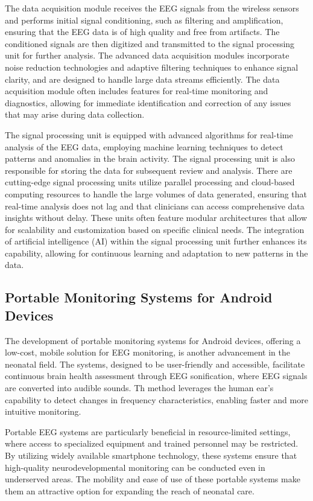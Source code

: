 \documentclass[12pt,journal,compsoc]{IEEEtran}
\begin{document}
The data acquisition module receives the EEG signals from the wireless sensors and performs initial signal conditioning, such as filtering and amplification, ensuring that the EEG data is of high quality and free from artifacts. The conditioned signals are then digitized and transmitted to the signal processing unit for further analysis. The advanced data acquisition modules incorporate noise reduction technologies and adaptive filtering techniques to enhance signal clarity, and are designed to handle large data streams efficiently. The data acquisition module often includes features for real-time monitoring and diagnostics, allowing for immediate identification and correction of any issues that may arise during data collection.

The signal processing unit is equipped with advanced algorithms for real-time analysis of the EEG data, employing machine learning techniques to detect patterns and anomalies in the brain activity. The signal processing unit is also responsible for storing the data for subsequent review and analysis. There are cutting-edge signal processing units utilize parallel processing and cloud-based computing resources to handle the large volumes of data generated, ensuring that real-time analysis does not lag and that clinicians can access comprehensive data insights without delay. These units often feature modular architectures that allow for scalability and customization based on specific clinical needs. The integration of artificial intelligence (AI) within the signal processing unit further enhances its capability, allowing for continuous learning and adaptation to new patterns in the data. 

\subsection{Portable Monitoring Systems for Android Devices}

The development of portable monitoring systems for Android devices, offering a low-cost, mobile solution for EEG monitoring, is another advancement in the neonatal field. The systems, designed to be user-friendly and accessible, facilitate continuous brain health assessment through EEG sonification, where EEG signals are converted into audible sounds. Th method leverages the human ear's capability to detect changes in frequency characteristics, enabling faster and more intuitive monitoring.

Portable EEG systems are particularly beneficial in resource-limited settings, where access to specialized equipment and trained personnel may be restricted. By utilizing widely available smartphone technology, these systems ensure that high-quality neurodevelopmental monitoring can be conducted even in underserved areas. The mobility and ease of use of these portable systems make them an attractive option for expanding the reach of neonatal care.
\end{document}
